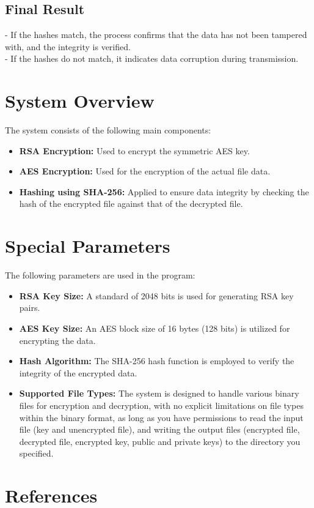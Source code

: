 \documentclass{article}
\begin{document}
\subsection*{Final Result}

- If the hashes match, the process confirms that the data has not been tampered with, and the integrity is verified. \\
- If the hashes do not match, it indicates data corruption during transmission. \\

\section{System Overview}
The system consists of the following main components:

\begin{itemize}
    \item \textbf{RSA Encryption:} Used to encrypt the symmetric AES key.
    \item \textbf{AES Encryption:} Used for the encryption of the actual file data.
    \item \textbf{Hashing using SHA-256:} Applied to ensure data integrity by checking the hash of the encrypted file against that of the decrypted file. 
\end{itemize}

\section{Special Parameters}
The following parameters are used in the program:
\begin{itemize}
    \item \textbf{RSA Key Size:} A standard of 2048 bits is used for generating RSA key pairs.
    \item \textbf{AES Key Size:} An AES block size of 16 bytes (128 bits) is utilized for encrypting the data.
    \item \textbf{Hash Algorithm:} The SHA-256 hash function is employed to verify the integrity of the encrypted data.
    \item \textbf{Supported File Types:} The system is designed to handle various binary files for encryption and decryption, with no explicit limitations on file types within the binary format, as long as you have permissions to read the input file (key and unencrypted file), and writing the output files (encrypted file, decrypted file, encrypted key, public and private keys) to the directory you specified.
\end{itemize}

\section{References}
\end{document}
